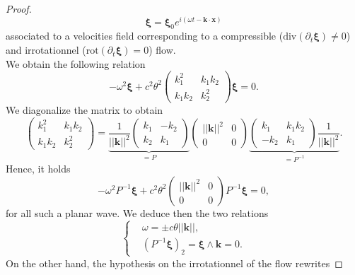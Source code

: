 \documentclass[a4paper, 11pt]{report}
\begin{document}
\begin{proof}
\begin{equation*}
\boldsymbol{\xi}=\boldsymbol{\xi}_0e^{i(\omega t-\boldsymbol{k}\cdot \boldsymbol{x})}
\end{equation*}
associated to a velocities field corresponding to a compressible ($\mathrm{div}(\partial_t\boldsymbol{\xi})\neq0$)
and irrotationnel ($\boldsymbol{\mathrm{rot}}(\partial_t\boldsymbol{\xi})=0$) flow.\\
We obtain the following relation
\begin{equation*}
-\omega^2\boldsymbol{\xi}+c^2\theta^2\begin{pmatrix}k_1^2 & k_1k_2\\ k_1k_2 & k_2^2\end{pmatrix}\boldsymbol{\xi}=0.
\end{equation*}
We diagonalize the matrix to obtain
\begin{equation*}
\begin{pmatrix}k_1^2 & k_1k_2\\ k_1k_2 & k_2^2\end{pmatrix}=\underbrace{\frac{1}{||\boldsymbol{k}||^2}\begin{pmatrix}k_1& -k_2\\ k_2 & k_1\end{pmatrix}}_{=P}\begin{pmatrix}||\boldsymbol{k}||^2&0\\ 0&0\end{pmatrix}\underbrace{\begin{pmatrix}k_1 & k_1k_2\\ -k_2 & k_1\end{pmatrix}\frac{1}{||\boldsymbol{k}||^2}}_{=P^{-1}}.
\end{equation*}
Hence, it holds
\begin{equation*}
-\omega^2P^{-1}\boldsymbol{\xi}+c^2\theta^2\begin{pmatrix}||\boldsymbol{k}||^2&0\\ 0&0\end{pmatrix}P^{-1}\boldsymbol{\xi}=0,
\end{equation*}
for all such a planar wave. 
We deduce then the two relations
\begin{equation*}
\left\{
\begin{split}
&\omega=\pm c\theta ||\boldsymbol{k}||,\\
&\left(P^{-1}\boldsymbol{\xi}\right)_2=\boldsymbol{\xi}\wedge\boldsymbol{k}=0.
\end{split}
\right.
\end{equation*}
On the other hand, the hypothesis on the irrotationnel of the flow rewrites

\end{proof}
\end{document}
